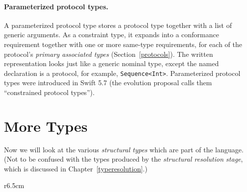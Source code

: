 \documentclass[../generics]{subfiles}
\begin{document}
\paragraph{Parameterized protocol types.}
A parameterized protocol type stores a protocol type together with a list of generic arguments. As a constraint type, it expands into a conformance requirement together with one or more same-type requirements, for each of the protocol's \emph{primary associated types} (Section~\ref{protocols}). The written representation looks just like a generic nominal type, except the named declaration is a protocol, for example, \texttt{Sequence<Int>}. Parameterized protocol types were introduced in Swift 5.7 \cite{se0346} (the evolution proposal calls them ``constrained protocol types'').

\section{More Types}\label{more types}

Now we will look at the various \emph{structural types} which are part of the language. (Not to be confused with the types produced by the \emph{structural resolution stage}, which is discussed in Chapter~\ref{typeresolution}.)

\begin{wrapfigure}[15]{r}{6.5cm}
\begin{center}
\end{center}
\end{wrapfigure}
\end{document}
